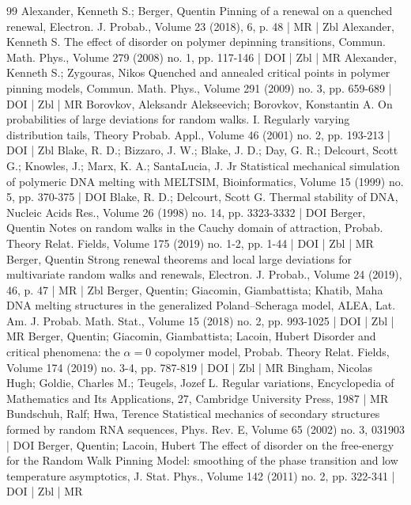 \begin{thebibliography}{99}
Alexander, Kenneth S.; Berger, Quentin Pinning of a renewal on a quenched renewal, Electron. J. Probab., Volume 23 (2018), 6, p. 48 | MR | Zbl
Alexander, Kenneth S. The effect of disorder on polymer depinning transitions, Commun. Math. Phys., Volume 279 (2008) no. 1, pp. 117-146 | DOI | Zbl | MR
Alexander, Kenneth S.; Zygouras, Nikos Quenched and annealed critical points in polymer pinning models, Commun. Math. Phys., Volume 291 (2009) no. 3, pp. 659-689 | DOI | Zbl | MR
Borovkov, Aleksandr Alekseevich; Borovkov, Konstantin A. On probabilities of large deviations for random walks. I. Regularly varying distribution tails, Theory Probab. Appl., Volume 46 (2001) no. 2, pp. 193-213 | DOI | Zbl
Blake, R. D.; Bizzaro, J. W.; Blake, J. D.; Day, G. R.; Delcourt, Scott G.; Knowles, J.; Marx, K. A.; SantaLucia, J. Jr Statistical mechanical simulation of polymeric DNA melting with MELTSIM, Bioinformatics, Volume 15 (1999) no. 5, pp. 370-375 | DOI
Blake, R. D.; Delcourt, Scott G. Thermal stability of DNA, Nucleic Acids Res., Volume 26 (1998) no. 14, pp. 3323-3332 | DOI
Berger, Quentin Notes on random walks in the Cauchy domain of attraction, Probab. Theory Relat. Fields, Volume 175 (2019) no. 1-2, pp. 1-44 | DOI | Zbl | MR
Berger, Quentin Strong renewal theorems and local large deviations for multivariate random walks and renewals, Electron. J. Probab., Volume 24 (2019), 46, p. 47 | MR | Zbl
Berger, Quentin; Giacomin, Giambattista; Khatib, Maha DNA melting structures in the generalized Poland–Scheraga model, ALEA, Lat. Am. J. Probab. Math. Stat., Volume 15 (2018) no. 2, pp. 993-1025 | DOI | Zbl | MR
Berger, Quentin; Giacomin, Giambattista; Lacoin, Hubert Disorder and critical phenomena: the $\alpha =0$ copolymer model, Probab. Theory Relat. Fields, Volume 174 (2019) no. 3-4, pp. 787-819 | DOI | Zbl | MR
Bingham, Nicolas Hugh; Goldie, Charles M.; Teugels, Jozef L. Regular variations, Encyclopedia of Mathematics and Its Applications, 27, Cambridge University Press, 1987 | MR
Bundschuh, Ralf; Hwa, Terence Statistical mechanics of secondary structures formed by random RNA sequences, Phys. Rev. E, Volume 65 (2002) no. 3, 031903 | DOI
Berger, Quentin; Lacoin, Hubert The effect of disorder on the free-energy for the Random Walk Pinning Model: smoothing of the phase transition and low temperature asymptotics, J. Stat. Phys., Volume 142 (2011) no. 2, pp. 322-341 | DOI | Zbl | MR

\end{thebibliography}
